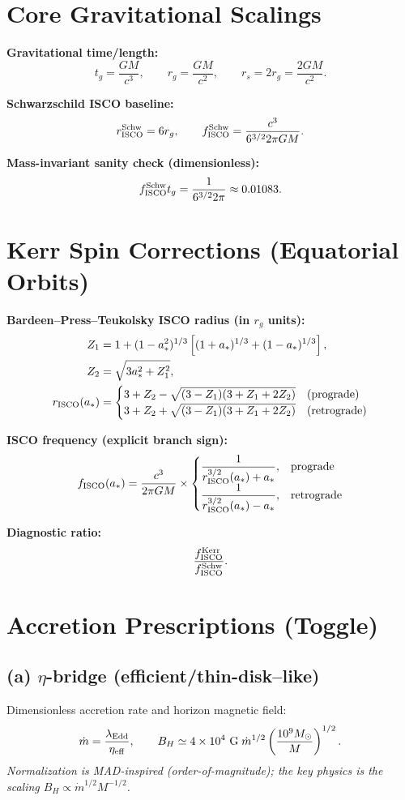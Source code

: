 \documentclass[12pt]{article}
\begin{document}
\section{Core Gravitational Scalings}
\textbf{Gravitational time/length:}
\[
t_g = \frac{GM}{c^3},\qquad
r_g = \frac{GM}{c^2},\qquad
r_s = 2r_g = \frac{2GM}{c^2}.
\]

\textbf{Schwarzschild ISCO baseline:}
\[
r_{\rm ISCO}^{\rm Schw} = 6 r_g,\qquad
f_{\rm ISCO}^{\rm Schw} = \frac{c^3}{6^{3/2} 2\pi GM}.
\]

\textbf{Mass-invariant sanity check (dimensionless):}
\[
f_{\rm ISCO}^{\rm Schw} t_g = \frac{1}{6^{3/2} 2\pi} \approx 0.01083.
\]

\section{Kerr Spin Corrections (Equatorial Orbits)}
\textbf{Bardeen–Press–Teukolsky ISCO radius (in $r_g$ units):}
\[
\begin{aligned}
Z_1 &= 1 + (1-a_*^2)^{1/3} \left[(1+a_*)^{1/3} + (1-a_*)^{1/3}\right],\\
Z_2 &= \sqrt{3a_*^2 + Z_1^2},\\
r_{\rm ISCO}(a_*) &=
\begin{cases}
3 + Z_2 - \sqrt{(3-Z_1)(3+Z_1+2Z_2)} & \text{(prograde)}\\
3 + Z_2 + \sqrt{(3-Z_1)(3+Z_1+2Z_2)} & \text{(retrograde)}
\end{cases}
\end{aligned}
\]

\textbf{ISCO frequency (explicit branch sign):}
\[
f_{\rm ISCO}(a_*) = \frac{c^3}{2\pi GM} \times
\begin{cases}
\dfrac{1}{r_{\rm ISCO}^{3/2}(a_*) + a_*}, & \text{prograde}\\[6pt]
\dfrac{1}{r_{\rm ISCO}^{3/2}(a_*) - a_*}, & \text{retrograde}
\end{cases}
\]

\textbf{Diagnostic ratio:}
\[
\frac{f_{\rm ISCO}^{\rm Kerr}}{f_{\rm ISCO}^{\rm Schw}}.
\]

\section{Accretion Prescriptions (Toggle)}
\subsection*{(a) $\eta$-bridge (efficient/thin-disk–like)}
Dimensionless accretion rate and horizon magnetic field:
\[
\dot m = \frac{\lambda_{\rm Edd}}{\eta_{\rm eff}},\qquad
B_H \simeq 4\times10^{4}\ {\rm G}\;\dot m^{1/2}\left(\frac{10^9 M_\odot}{M}\right)^{1/2}.
\]
\textit{Normalization is MAD-inspired (order-of-magnitude); the key physics is the scaling $B_H \propto \dot m^{1/2} M^{-1/2}$.}
\end{document}
